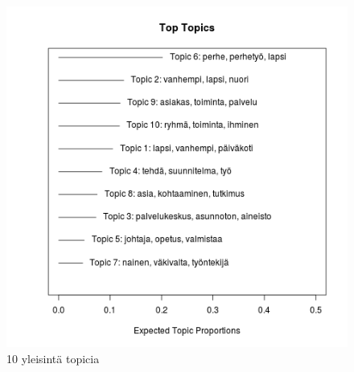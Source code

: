 

\begin{center}
\begin{figure}[ht!]

\includegraphics{toptopics.png}

\caption{10 yleisintä topicia}
\label{kuvio1}
\end{figure}
\end{center}




